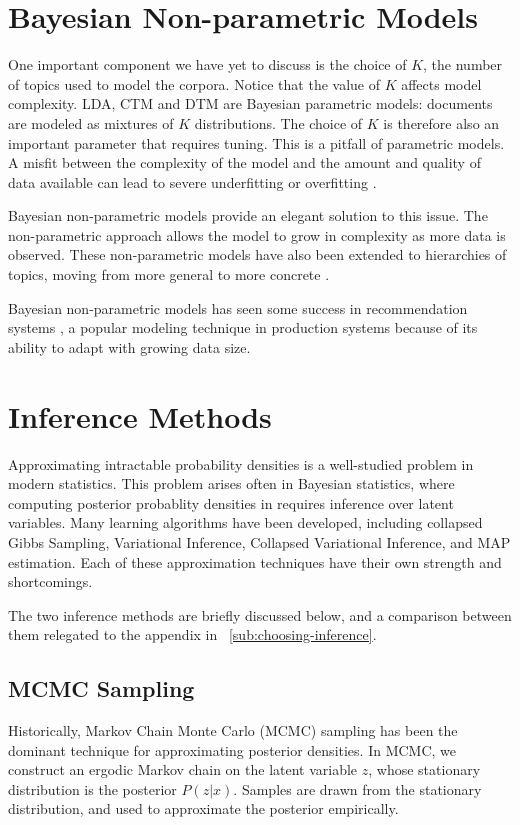 \documentclass[letterpaper]{article}
\begin{document}
\section{Bayesian Non-parametric Models}
One important component we have yet to discuss is the choice of $K$,
the number of topics used to model the corpora. Notice that the value
of $K$ affects model complexity. LDA, CTM and DTM are Bayesian
parametric models: documents are modeled as mixtures of $K$
distributions. The choice of $K$ is therefore also an important
parameter that requires tuning. This is a pitfall of parametric
models. A misfit between the complexity of the model and the amount
and quality of data available can lead to severe underfitting or
overfitting \cite{teh2011dirichlet}.

Bayesian non-parametric models provide an elegant solution to this
issue. The non-parametric approach allows the model to grow in
complexity as more data is observed. These non-parametric models have
also been extended to hierarchies of topics, moving from more general
to more concrete \cite{blei2010nested}.

Bayesian non-parametric models has seen some success in
recommendation systems \cite{gopalan2014bayesian}, a popular modeling
technique in production systems because of its ability to adapt with
growing data size.

\section{Inference Methods}
\label{sec:inference}
Approximating intractable probability densities is a well-studied
problem in modern statistics. This problem arises often in Bayesian
statistics, where computing posterior probablity densities in requires
inference over latent variables. Many learning algorithms have been
developed, including collapsed Gibbs Sampling, Variational Inference,
Collapsed Variational Inference, and MAP estimation. Each of these
approximation techniques have their own strength and shortcomings.

The two inference methods are briefly discussed below, and a
comparison between them relegated to the appendix in
~\autoref{sub:choosing-inference}.

\subsection{MCMC Sampling}
\label{subsec:mcmc-sampling}
Historically, Markov Chain Monte Carlo (MCMC) sampling has been the
dominant technique for approximating posterior densities. In MCMC, we
construct an ergodic Markov chain on the latent variable $z$,
whose stationary distribution is the posterior $P( z | x)$.
Samples are drawn from the stationary distribution, and used to
approximate the posterior empirically.
\end{document}
